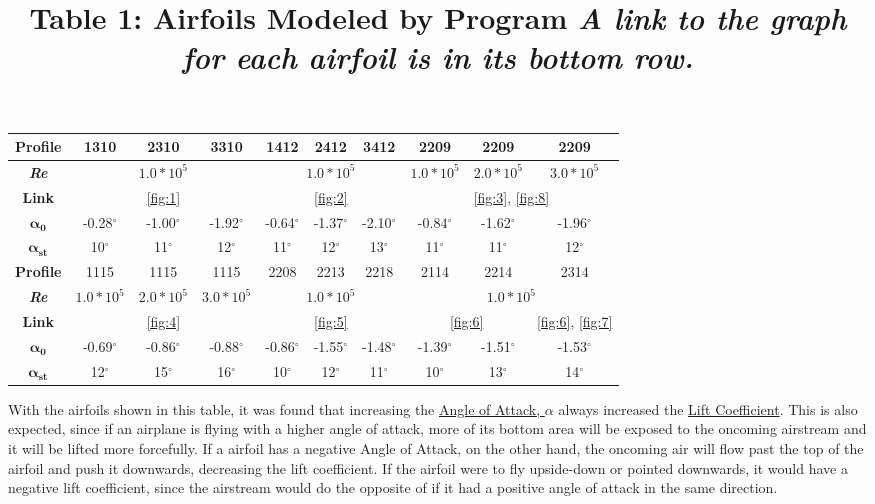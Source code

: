 \documentclass{article}
\begin{document}
\begin{table}[bp]
	\centering
	\title{Table 1: Airfoils Modeled by Program \newline}
	\title{\emph{A link to the graph for each airfoil is in its bottom row.}} \label{table:1}
	\begin{tabular}{ | c | c | c | c | c | c | c | c | c | c |}
		\hline
		 \textbf{Profile} & 1310 & 2310 & 3310 & 1412 & 2412 & 3412 & 2209 & 2209 & 2209 \\ \hline
		 \textbf{\emph{Re}} & \multicolumn{3}{c|}{$1.0*10^5$}  & \multicolumn{3}{c|}{$1.0*10^5$} & $1.0*10^5$ & $2.0*10^5$ & $3.0*10^5$ \\ \hline
		 \textbf{Link} & \multicolumn{3}{c|}{\ref{fig:1}} & \multicolumn{3}{c|}{\ref{fig:2}} & \multicolumn{3}{c|}{\ref{fig:3}, \ref{fig:8}}\\ \hline 
		 $\mathbf{\alpha_{0}}$ & -0.28$^{\circ}$ & -1.00$^{\circ}$ & -1.92$^{\circ}$ & -0.64$^{\circ}$ & -1.37$^{\circ}$ & -2.10$^{\circ}$ & -0.84$^{\circ}$ & -1.62$^{\circ}$ & -1.96$^{\circ}$ \\ \hline
		 $\mathbf{\alpha_{st}}$ & 10$^{\circ}$ & 11$^{\circ}$ & 12$^{\circ}$ & 11$^{\circ}$ & 12$^{\circ}$ & 13$^{\circ}$ & 11$^{\circ}$ & 11$^{\circ}$ & 12$^{\circ}$ \\ \hline \hline
		 \newline
		 \textbf{Profile} & 1115 & 1115 & 1115 & 2208 & 2213 & 2218 & 2114 & 2214 & 2314 \\ \hline
		 \textbf{\emph{Re}} & $1.0*10^5$ & $2.0*10^5$ & $3.0*10^5$ & \multicolumn{3}{c|}{$1.0*10^5$} & \multicolumn{3}{c|}{$1.0*10^5$} \\ \hline
		 \textbf{Link} & \multicolumn{3}{c|}{\ref{fig:4}}& \multicolumn{3}{c|}{\ref{fig:5}} & \multicolumn{2}{c|}{\ref{fig:6}} & \ref{fig:6}, \ref{fig:7} \\ \hline
		 $\mathbf{\alpha_{0}}$ & -0.69$^{\circ}$ & -0.86$^{\circ}$ & -0.88$^{\circ}$ & -0.86$^{\circ}$ & -1.55$^{\circ}$ & -1.48$^{\circ}$ & -1.39$^{\circ}$ & -1.51$^{\circ}$ & -1.53$^{\circ}$ \\ \hline
		 $\mathbf{\alpha_{st}}$ & 12$^{\circ}$ & 15$^{\circ}$ & 16$^{\circ}$ & 10$^{\circ}$ & 12$^{\circ}$ & 11$^{\circ}$ & 10$^{\circ}$ & 13$^{\circ}$ & 14$^{\circ}$ \\ \hline
	\end{tabular}
\end{table}

With the airfoils shown in this table, it was found that increasing the \hyperlink{alpha}{Angle of Attack, $\alpha$} always increased the \hyperlink{CL}{Lift Coefficient}. This is also expected, since if an airplane is flying with a higher angle of attack, more of its bottom area will be exposed to the oncoming airstream and it will be lifted more forcefully. If a airfoil has a negative Angle of Attack, on the other hand, the oncoming air will flow past the top of the airfoil and push it downwards, decreasing the lift coefficient. If the airfoil were to fly upside-down or pointed downwards, it would have a negative lift coefficient, since the airstream would do the opposite of if it had a positive angle of attack in the same direction.\newline
\end{document}

